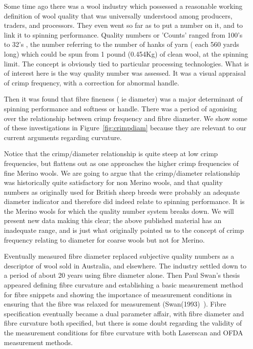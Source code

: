 \documentclass{article}
\begin{document}
Some time ago there was a wool industry which possessed a reasonable working definition of wool quality that was universally understood among producers, traders, and processors. They even went so far as to put a number on it, and to link it to spinning performance. Quality numbers  or 'Counts' ranged from 100's to 32's , the number referring to the number of hanks of yarn ( each 560 yards long)  which could be spun from 1 pound (0.454Kg) of clean wool, at the spinning limit. The concept is obviously tied to particular processing technologies. What is of interest here is the way quality number was assessed.  It was a visual appraisal of crimp frequency, with a correction for abnormal handle.

Then it was found that fibre fineness ( ie diameter) was a major determinant of spinning performance and softness or handle. There was a period of agonising over the relationship between crimp frequency and fibre diameter. We show some of these investigations in Figure~\ref{fig:crimpdiam} because they are relevant to our current arguments regarding curvature. 

Notice that the crimp/diameter relationship is quite steep at low crimp frequencies, but flattens out as one approaches the higher crimp frequencies of fine Merino wools. We are going to argue that the crimp/diameter relationship was historically quite satisfactory for non Merino wools, and that quality numbers as originally used for British sheep breeds were probably an adequate diameter indicator and therefore did indeed  relate to spinning performance. It is the Merino wools for which the quality number system breaks down. We will present new data making this clear; the above published material has an inadequate range, and is just what originally pointed us to the concept of crimp frequency relating to diameter for coarse wools but not for Merino.

Eventually measured fibre diameter replaced subjective quality numbers as a descriptor of wool sold in Australia, and elsewhere. The industry settled down to a period of about 20 years using fibre diameter alone. Then Paul Swan's thesis appeared defining fibre curvature and establishing a basic measurement method for fibre snippets and showing the importance of measurement conditions in ensuring that the fibre was relaxed for measurement (Swan(1993)~\cite{swan-1993}).  Fibre specification eventually became a dual parameter affair, with fibre diameter and fibre curvature both specified, but there is some doubt regarding the validity of the measurement conditions for fibre curvature with both Laserscan and OFDA measurement methods. 
\end{document}
